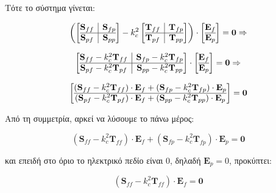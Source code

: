 \documentclass[10pt, letterpaper]{article}
\begin{document}
Τότε το σύστημα γίνεται:

\[ \left(
  \left[ \begin{array}{@{}c|c@{}}
    \mathbf{S}_{ff} & \mathbf{S}_{fp} \\
    \hline
    \mathbf{S}_{pf} & \mathbf{S}_{pp}
    \end{array} \right] - k_c^2 
    \left[ \begin{array}{@{}c|c@{}}
      \mathbf{T}_{ff} & \mathbf{T}_{fp} \\
      \hline
      \mathbf{T}_{pf} & \mathbf{T}_{pp}
      \end{array} \right]
  \right)
  \cdot \left[ \begin{array}{@{}c@{}}
    \mathbf{E}_f \\
    \hline
    \mathbf{E}_p
    \end{array} \right] = \mathbf{0}    \Rightarrow
\]

\[
  \left[ \begin{array}{@{}c|c@{}}
    \mathbf{S}_{ff} - k_c^2 \mathbf{T}_{ff} & \mathbf{S}_{fp} - k_c^2 \mathbf{T}_{fp} \\
    \hline
    \mathbf{S}_{pf} - k_c^2 \mathbf{T}_{pf} & \mathbf{S}_{pp} - k_c^2 \mathbf{T}_{pp}
    \end{array} \right]
\cdot \left[ \begin{array}{@{}c@{}}
  \mathbf{E}_f \\
  \hline
  \mathbf{E}_p
  \end{array} \right] = \mathbf{0}  \Rightarrow
\]

\[
  \left[ \begin{array}{@{}c@{}}
    (\mathbf{S}_{ff} - k_c^2 \mathbf{T}_{ff}) \cdot \mathbf{E}_f + (\mathbf{S}_{fp} - k_c^2 \mathbf{T}_{fp}) \cdot \mathbf{E}_p\\
    \hline
    (\mathbf{S}_{pf} - k_c^2 \mathbf{T}_{pf}) \cdot \mathbf{E}_f + (\mathbf{S}_{pp} - k_c^2 \mathbf{T}_{pp}) \cdot \mathbf{E}_p
    \end{array} \right] = \mathbf{0}  
\]
 
Από τη συμμετρία, αρκεί να λύσουμε το πάνω μέρος:

\[(\mathbf{S}_{ff} - k_c^2 \mathbf{T}_{ff}) \cdot \mathbf{E}_f + (\mathbf{S}_{fp} - k_c^2 \mathbf{T}_{fp}) \cdot \mathbf{E}_p = \mathbf{0}\]


και επειδή στο όριο το ηλεκτρικό πεδίο είναι 0, δηλαδή $\mathbf{E}_p = 0$, προκύπτει:

\begin{equation}
  (\mathbf{S}_{ff} - k_c^2 \mathbf{T}_{ff}) \cdot \mathbf{E}_f = \mathbf{0}
\end{equation}
\end{document}
